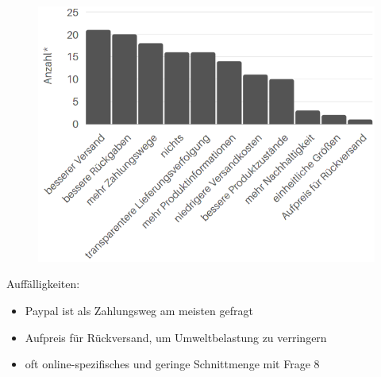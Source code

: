 \documentclass[a4paper, 12pt]{scrartcl}
\begin{document}
\begin{figure}[H]
    \begin{center}
        \includegraphics[width=12cm]{media/schuelerumfrage/7.png} 
    \end{center}
\end{figure}
\vfill\vfill
\noindent Auffälligkeiten:
\begin{itemize}
 \item Paypal ist als Zahlungsweg am meisten gefragt
 \item Aufpreis für Rückversand, um Umweltbelastung zu verringern
 \item oft online-spezifisches und geringe Schnittmenge mit Frage 8
 \end{itemize}
\vfill\vfill\vfill\vfill
\end{document}
